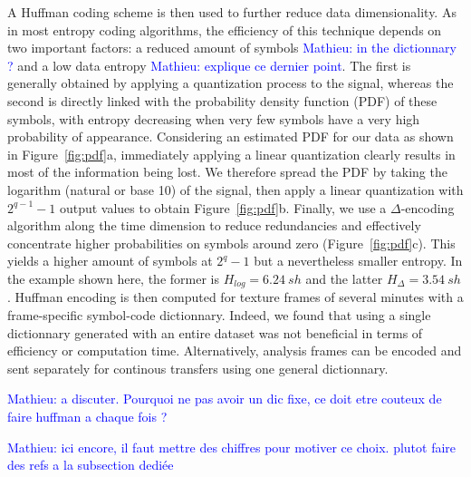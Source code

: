 \documentclass[final,3p,times,twocolumn]{elsarticle}
\newcommand{\ml}[1]{\textcolor{blue}{ Mathieu: #1}}
\begin{document}
A Huffman coding scheme \cite{} is then used to further reduce data dimensionality. As in most entropy coding algorithms, the efficiency of this technique depends on two important factors: a reduced amount of symbols \ml{in the dictionnary ?} and a low data entropy \ml{explique ce dernier point}. The first is generally obtained by applying a quantization process to the signal, whereas the second is directly linked with the probability density function (PDF) of these symbols, with entropy decreasing when very few symbols have a very high probability of appearance. Considering an estimated PDF for our data as shown in Figure~\ref{fig:pdf}a, immediately applying a linear quantization clearly results in most of the information being lost. We therefore spread the PDF by taking the logarithm (natural or base 10) of the signal, then apply a linear quantization with $2^{q-1}-1$ output values to obtain Figure~\ref{fig:pdf}b. Finally, we use a $\Delta$-encoding algorithm \cite{} along the time dimension to reduce redundancies and effectively concentrate higher probabilities on symbols around zero (Figure~\ref{fig:pdf}c). This yields a higher amount of symbols at $2^q-1$ but a nevertheless smaller entropy. In the example shown here, the former is $H_{log} = 6.24~sh$ and the latter $H_{\Delta} = 3.54~sh$. Huffman encoding is then computed for texture frames of several minutes with a frame-specific symbol-code dictionnary. Indeed, we found that using a single dictionnary generated with an entire dataset was not beneficial in terms of efficiency or computation time. Alternatively, analysis frames can be encoded and sent separately for continous transfers using one general dictionnary.

\ml{a discuter. Pourquoi ne pas avoir un dic fixe, ce doit etre couteux de faire huffman a chaque fois ?}

\ml{ici encore, il faut mettre des chiffres pour motiver ce choix. plutot faire des refs a la subsection dediée}
\end{document}
